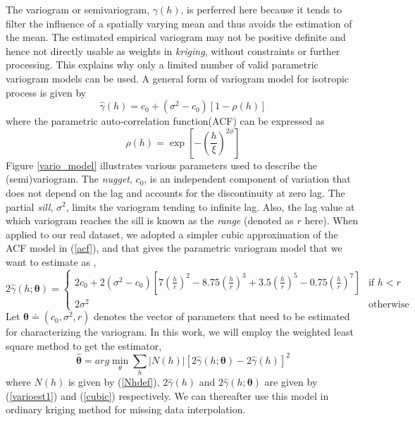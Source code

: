 \documentclass[english]{article}
\numberwithin{equation}{section}
\numberwithin{table}{section}
\numberwithin{figure}{section}
\begin{document}
The variogram or semivariogram, $\gamma(h)$, 
is perferred here because it tends to filter the
influence of a spatially varying mean and thus avoids the estimation
of the mean. The estimated empirical variogram may not be positive
definite and hence not directly usable as weights in \emph{kriging}, 
without constraints or further processing. This explains why
only a limited number of valid parametric variogram models can be used.
A general form of variogram model for isotropic process is given by
\begin{equation} \label{variomod}
  \hat{\gamma}(h) = c_0 + (\sigma^2 - c_0)[ 1- \rho(h)]
\end{equation}
where the parametric auto-correlation function(ACF) can be expressed as 
\begin{equation} \label{acf}
  \rho(h) = \exp{ \left[-\left( \frac{h}{\xi} \right)^{2\phi} \right] }
\end{equation}
Figure \ref{vario_model} illustrates various parameters used to
describe the (semi)variogram. The \emph{nugget}, $c_0$, is an 
independent component of variation that does not depend on the lag
and accounts for the discontinuity at zero lag. The partial
\emph{sill}, $\sigma^2$, limits the variogram tending to infinite
lag. Also, the lag value at which variogram reaches the sill is
known as the \emph{range} (denoted as $r$ here). When applied to our
real dataset, we adopted a simpler cubic approximation 
of the ACF model in (\ref{acf}), and that gives the parametric variogram
model that we want to estimate as \cite{geoR},
\begin{equation} \label{cubic}
  2\hat{\gamma}(h;\bm{\theta}) = 
\begin{cases} 
  2c_0 + 2(\sigma^2 - c_0) 
  \left[ 7\left( \frac{h}{r} \right)^2 - 8.75\left( \frac{h}{r} \right)^3
  + 3.5\left( \frac{h}{r}\right)^5 - 0.75\left( \frac{h}{r}\right)^7
  \right] & \mbox{if $h<r$} \\
  2\sigma^2 & \mbox{otherwise}
\end{cases}
\end{equation}
Let $\bm{\theta} \doteq (c_0, \sigma^2, r)$ denotes the vector of
parameters that need to be estimated for characterizing the
variogram. In this work, we will employ the weighted least square method
to get the estimator,
\begin{equation} \label{variowls}
  \hat{\bm{\theta}} = arg\min_{\theta} \sum_h |N(h)|\left[
    2\hat{\gamma}(h; \bm{\theta}) - 2\hat{\gamma}(h) \right]^2
\end{equation}
where $N(h)$ is given by (\ref{Nhdef}), $2\hat{\gamma}(h)$ and
$2\hat{\gamma}(h;\bm{\theta})$ are given by (\ref{varioest1}) and
(\ref{cubic}) respectively. We can thereafter use this model in
ordinary kriging method for missing data interpolation. 
\end{document}
